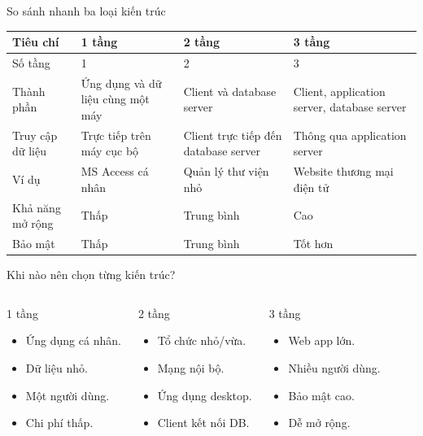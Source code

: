 \documentclass[aspectratio=169,11pt]{beamer}
\newcommand{\tightlist}{\setlength{\itemsep}{2pt}\setlength{\parskip}{0pt}}
\begin{document}
\begin{frame}{So sánh nhanh ba loại kiến trúc}
\scriptsize
\begin{tabularx}{\textwidth}{p{} X X X}
\toprule
\textbf{Tiêu chí} & \textbf{1 tầng} & \textbf{2 tầng} & \textbf{3 tầng} \\
\midrule
Số tầng & 1 & 2 & 3 \\
Thành phần & Ứng dụng và dữ liệu cùng một máy & Client và database server & Client, application server, database server \\
Truy cập dữ liệu & Trực tiếp trên máy cục bộ & Client trực tiếp đến database server & Thông qua application server \\
Ví dụ & MS Access cá nhân & Quản lý thư viện nhỏ & Website thương mại điện tử \\
Khả năng mở rộng & Thấp & Trung bình & Cao \\
Bảo mật & Thấp & Trung bình & Tốt hơn \\
\bottomrule
\end{tabularx}
\end{frame}

\begin{frame}{Khi nào nên chọn từng kiến trúc?}
\small
\begin{columns}[T]
\begin{block}{1 tầng}
\begin{itemize}
\tightlist
  \item Ứng dụng cá nhân.
  \item Dữ liệu nhỏ.
  \item Một người dùng.
  \item Chi phí thấp.
\end{itemize}
\end{block}

\begin{block}{2 tầng}
\begin{itemize}
\tightlist
  \item Tổ chức nhỏ/vừa.
  \item Mạng nội bộ.
  \item Ứng dụng desktop.
  \item Client kết nối DB.
\end{itemize}
\end{block}

\begin{block}{3 tầng}
\begin{itemize}
\tightlist
  \item Web app lớn.
  \item Nhiều người dùng.
  \item Bảo mật cao.
  \item Dễ mở rộng.
\end{itemize}
\end{block}
\end{columns}
\end{frame}
\end{document}
